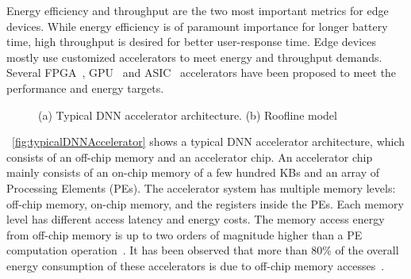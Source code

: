 \documentclass[a4paper,10pt]{article}
\begin{document}
Energy efficiency and throughput are the two most important metrics for edge devices. While energy efficiency is of paramount importance for longer battery time, high throughput is desired for better user-response time. Edge devices mostly use customized accelerators to meet energy and throughput demands. Several FPGA~\cite{zhang2015optimizing,wei2019overcoming,gokhale2014240,8742284,gupta2015deep,alwani2016fused}, GPU~\cite{chetlur2014cudnn} and ASIC~\cite{Chen2016EyerissAS,chen2014diannao,chen2014dadiannao,du2015shidiannao} accelerators have been proposed to meet the performance and energy targets. 
\begin{figure}[!htb]
	\centering
    \captionsetup{font=sf}
	\hfil
	\caption{(a) Typical DNN accelerator architecture. (b) Roofline model}
	\label{fig:acceleratorAndRoofline}
\end{figure}

\figurename{~\ref{fig:typicalDNNAccelerator}} shows a typical DNN accelerator architecture, which consists of an off-chip memory and an accelerator chip. An accelerator chip mainly consists of an on-chip memory of a few hundred KBs and an array of Processing Elements (PEs). The accelerator system has multiple memory levels: off-chip memory, on-chip memory, and the registers inside the PEs. Each memory level has different access latency and energy costs. The memory access energy from off-chip memory is up to two orders of magnitude higher than a PE computation operation~\cite{Chen2016EyerissAS}. It has been observed that more than 80\% of the overall energy consumption of these accelerators is due to off-chip memory accesses~\cite{chen2014diannao}. 
\end{document}
